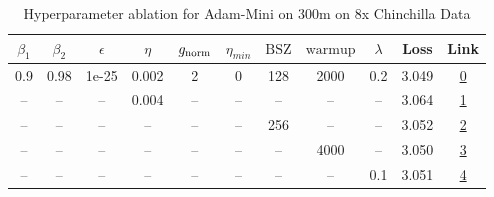 \begin{table}[H]
\centering
\caption{Hyperparameter ablation for Adam-Mini on 300m on 8x Chinchilla Data}
\label{tab:ablation_adam-mini_300m_on_8x_chinchilla_data}
\begin{tabular}{ccccccccccc}
\toprule
$\beta_1$ & $\beta_2$ & $\epsilon$ & $\eta$ & $g_{\mathrm{norm}}$ & $\eta_{min}$ & $\mathrm{BSZ}$ & $\mathrm{warmup}$ & $\lambda$ & Loss & Link \\
\midrule
0.9 & 0.98 & 1e-25 & 0.002 & 2 & 0 & 128 & 2000 & 0.2 & 3.049 & \href{https://wandb.ai/marin-community/optimizer-scaling/runs/sweep-300m-48B-minic8695flr0.002-wd0.2-minlr0-warmup2000-b10.9-b-952cc4}{0} \\
\midrule
-- & -- & -- & 0.004 & -- & -- & -- & -- & -- & 3.064 & \href{https://wandb.ai/marin-community/optimizer-scaling/runs/sweep-300m-48B-minid13807lr0.004-wd0.2-minlr0-warmup2000-b10.9-b-c8b391}{1} \\
-- & -- & -- & -- & -- & -- & 256 & -- & -- & 3.052 & \href{https://wandb.ai/marin-community/optimizer-scaling/runs/sweep-300m-48B-mini54b665lr0.002-wd0.2-minlr0-warmup2000-b10.9-b-bb57bb}{2} \\
-- & -- & -- & -- & -- & -- & -- & 4000 & -- & 3.050 & \href{https://wandb.ai/marin-community/optimizer-scaling/runs/sweep-300m-48B-mini8ec643lr0.002-wd0.2-minlr0-warmup4000-b10.9-b-efe5ba}{3} \\
-- & -- & -- & -- & -- & -- & -- & -- & 0.1 & 3.051 & \href{https://wandb.ai/marin-community/optimizer-scaling/runs/sweep-300m-48B-mini293878lr0.002-wd0.1-minlr0-warmup2000-b10.9-b-f38163}{4} \\
\bottomrule
\end{tabular}
\end{table}

